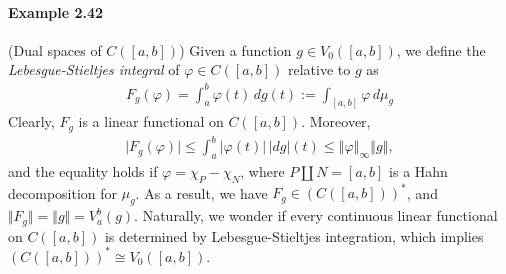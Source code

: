 \documentclass{article}
\begin{document}
\paragraph{Example 2.42\label{example:2.42}} (Dual spaces of $C([a,b])$)
Given a function $g\in V_0([a,b])$, we define the \textit{Lebesgue-Stieltjes integral} of $\varphi\in C([a,b])$ relative to $g$ as
\begin{align*}
	F_g(\varphi) = \int_a^b\varphi(t)\,dg(t) := \int_{[a,b]}\varphi\,d\mu_g
\end{align*}
Clearly, $F_g$ is a linear functional on $C([a,b])$. Moreover,
\begin{align*}
	\vert F_g(\varphi)\vert\leq \int_a^b\vert\varphi(t)\vert\,\vert dg\vert(t) \leq \left\Vert \varphi\right\Vert_\infty\left\Vert g\right\Vert,
\end{align*}
and the equality holds if $\varphi=\chi_P - \chi_N$, where $P\amalg N=[a,b]$ is a Hahn decomposition for $\mu_g$. As a result, we have $F_g\in\left(C([a,b])\right)^*$, and $\Vert F_g\Vert = \Vert g\Vert = V_a^b(g)$. Naturally, we wonder if every continuous linear functional on $C([a,b])$ is determined by Lebesgue-Stieltjes integration, which implies $(C([a,b]))^*\cong V_0([a,b])$.
\end{document}
